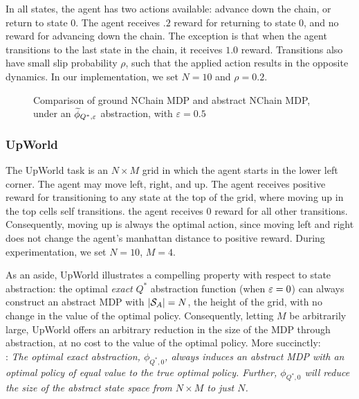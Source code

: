 In all states, the agent has two actions available: advance down the chain, or return to state 0. The agent receives $.2$ reward for returning to state 0, and no reward for advancing down the chain. The exception is that when the agent transitions to the last state in the chain, it receives $1.0$ reward. Transitions also have small slip probability $\rho$, such that the applied action results in the opposite dynamics. In our implementation, we set $N=10$ and $\rho=0.2$.
\begin{figure}[h]
\centering
{}
\hspace{6mm}
\label{fig:nchain-visual}
\caption{Comparison of ground NChain \ac{MDP} and abstract NChain \ac{MDP}, under an $\widetilde \phi_{Q^*,\varepsilon}$ abstraction, with $\varepsilon=0.5$}
\end{figure} 

\subsubsection{UpWorld}

The UpWorld task is an $N\times M$ grid in which the agent starts in the lower left corner. The agent may move left, right, and up. The agent receives positive reward for transitioning to any state at the top of the grid, where moving up in the top cells self transitions. the agent receives 0 reward for all other transitions. Consequently, moving up is always the optimal action, since moving left and right does not change the agent's manhattan distance to positive reward. During experimentation, we set $N=10$, $M=4$.

As an aside, UpWorld illustrates a compelling property with respect to state abstraction: the optimal {\it exact} $Q^*$ abstraction function (when $\varepsilon=0$) can always construct an abstract MDP with $|\mathcal{S}_A| = N$, the height of the grid, with no change in the value of the optimal policy. Consequently, letting $M$ be arbitrarily large, UpWorld offers an arbitrary reduction in the size of the MDP through abstraction, at no cost to the value of the optimal policy. More succinctly: \\

: {\it The optimal exact abstraction, $\phi_{Q^*,0}$, always induces an abstract MDP with an optimal policy of equal value to the true optimal policy. Further, $\phi_{Q^*,0}$ will reduce the size of the abstract state space from $N \times M$ to just $N$.} \\

